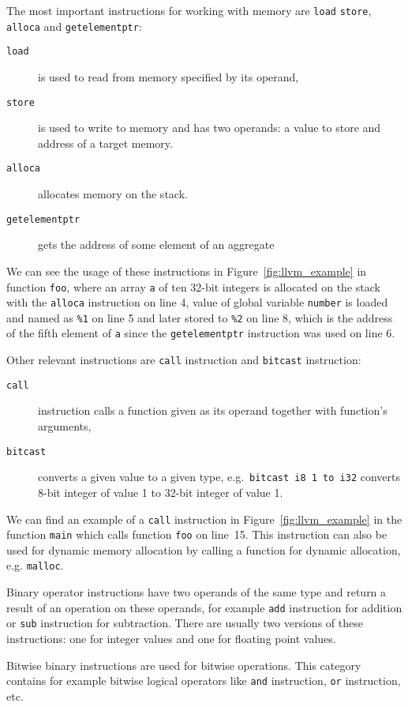 The most important instructions for working with memory are \texttt{load}
\texttt{store}, \texttt{alloca} and \texttt{getelementptr}:
\begin{description}
\item[\texttt{load}] is used to read from memory specified by its operand,
\item[\texttt{store}] is used to write to memory and has two operands: a value
to store and address of a target memory.
\item[\texttt{alloca}] allocates memory on the stack.
\item[\texttt{getelementptr}] gets the address of some element of an aggregate
\end{description}
We can see the usage of these instructions in Figure~\ref{fig:llvm_example} in
function \texttt{foo}, where an array \texttt{a} of ten 32-bit integers is
allocated on the stack with the \texttt{alloca} instruction on line 4, value of
global variable \texttt{number} is loaded and named as \texttt{\%1} on line 5
and later stored to \texttt{\%2} on line 8, which is the address of the fifth
element of \texttt{a} since the \texttt{getelementptr} instruction was used on
line 6.

Other relevant instructions are \texttt{call} instruction and \texttt{bitcast}
instruction:
\begin{description}
\item[\texttt{call}] instruction calls a function given as its
operand together with function's arguments,
\item[\texttt{bitcast}] converts a given value to a given type, e.g.~\texttt{bitcast i8 1 to
i32} converts 8-bit integer of value 1 to 32-bit integer of value 1.
\end{description}
 We can find an example of a \texttt{call} instruction in
 Figure~\ref{fig:llvm_example} in the function \texttt{main} which calls
 function \texttt{foo} on line~15. This instruction can also be used for
 dynamic memory allocation by calling a function for dynamic allocation, e.g.
 \texttt{malloc}.

Binary operator instructions have two operands of the same type and return a
result of an operation on these operands, for example \texttt{add} instruction
for addition or \texttt{sub} instruction for subtraction. There are usually two
versions of these instructions: one for integer values and one for floating
point values.

Bitwise binary instructions are used for bitwise operations. This category
contains for example bitwise logical operators like \texttt{and} instruction,
\texttt{or} instruction, etc.



